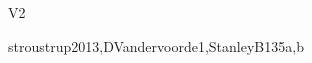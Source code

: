 \begin{syllabus}
\begin{competences}{V2}
    \item {} 
    \item {} 
    \item {}
    \item {} 
    \item {}
\end{competences}

\begin{unit}{\SDFFundamentalProgrammingConcepts}{}{stroustrup2013,DVandervoorde1,StanleyB13}{5}{a,b}
\begin{topics}
	\item \SDFFundamentalProgrammingConceptsTopicBasic
	\item \SDFFundamentalProgrammingConceptsTopicVariables
	\item \SDFFundamentalProgrammingConceptsTopicExpressions
	\item \SDFFundamentalProgrammingConceptsTopicSimple
	\item \SDFFundamentalProgrammingConceptsTopicConditional
	\item \SDFFundamentalProgrammingConceptsTopicFunctions
	\item \SDFFundamentalProgrammingConceptsTopicThe
\end{topics}

\begin{learningoutcomes}
	\item \SDFFundamentalProgrammingConceptsLOAnalyzeAndBehavior [\Usage]
	\item \SDFFundamentalProgrammingConceptsLOIdentifyAndOf [\Usage]
	\item \SDFFundamentalProgrammingConceptsLOWritePrograms [\Usage]
	\item \SDFFundamentalProgrammingConceptsLOModify [\Usage]
	\item \SDFFundamentalProgrammingConceptsLODesignImplement [\Usage]
	\item \SDFFundamentalProgrammingConceptsLOWriteAUses [\Usage]
	\item \SDFFundamentalProgrammingConceptsLOChooseAppropriateIteration [\Usage]
	\item \SDFFundamentalProgrammingConceptsLODescribeTheRecursion [\Usage]
	\item \SDFFundamentalProgrammingConceptsLOIdentifyTheAndCase [\Usage]
\end{learningoutcomes}
\end{unit}


\end{syllabus}
